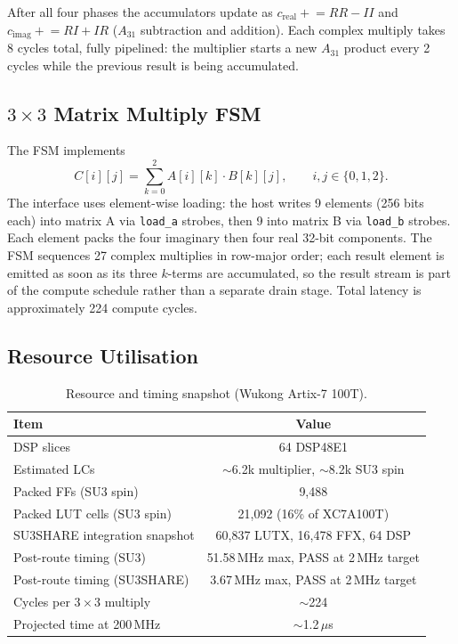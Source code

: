 \documentclass[conference]{IEEEtran}
\begin{document}
After all four phases the accumulators update as
$c_{\mathrm{real}} \mathrel{+}= RR - II$ and
$c_{\mathrm{imag}} \mathrel{+}= RI + IR$ ($A_{31}$ subtraction and
addition). Each complex multiply takes 8 cycles total, fully pipelined: the
multiplier starts a new $A_{31}$ product every 2 cycles while the previous
result is being accumulated.

\subsection{$3\times3$ Matrix Multiply FSM}

The FSM implements
\begin{equation}
C[i][j] = \sum_{k=0}^{2} A[i][k]\cdot B[k][j], \qquad i,j \in \{0,1,2\}.
\end{equation}
The interface uses element-wise loading: the host writes 9 elements
(256 bits each) into matrix A via \texttt{load\_a} strobes, then 9 into
matrix B via \texttt{load\_b} strobes. Each element packs the four
imaginary then four real 32-bit components. The FSM sequences 27 complex
multiplies in row-major order; each result element is emitted as soon as
its three $k$-terms are accumulated, so the result stream is part of the
compute schedule rather than a separate drain stage. Total latency is
approximately 224 compute cycles.

\subsection{Resource Utilisation}

\begin{table}[ht]
\centering
\caption{Resource and timing snapshot (Wukong Artix-7 100T).}
\label{tab:resources}
\begin{tabular}{lc}
\toprule
Item & Value \\
\midrule
DSP slices & 64 DSP48E1 \\
Estimated LCs & $\sim$6.2k multiplier, $\sim$8.2k SU3 spin \\
Packed FFs (SU3 spin) & 9,488 \\
Packed LUT cells (SU3 spin) & 21,092 (16\% of XC7A100T) \\
SU3SHARE integration snapshot & 60,837 LUTX, 16,478 FFX, 64 DSP \\
Post-route timing (SU3) & 51.58\,MHz max, PASS at 2\,MHz target \\
Post-route timing (SU3SHARE) & 3.67\,MHz max, PASS at 2\,MHz target \\
Cycles per $3\times3$ multiply & $\sim$224 \\
Projected time at 200\,MHz & $\sim$1.2\,$\mu$s \\
\bottomrule
\end{tabular}
\end{table}
\end{document}
